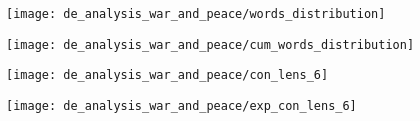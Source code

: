 \begin{minipage}[hbt]{9cm}
	\centering
	\texttt{[image: de\_analysis\_war\_and\_peace/words\_distribution]}
	\label{Bild1}
\end{minipage}
\hfill
\begin{minipage}[hbt]{9cm}
	\centering
	\texttt{[image: de\_analysis\_war\_and\_peace/cum\_words\_distribution]}
	\label{Bild2}
\end{minipage}
\begin{minipage}[hbt]{9cm}
	\centering
	\texttt{[image: de\_analysis\_war\_and\_peace/con\_lens\_6]}
	\label{Bild1}
\end{minipage}
\hfill
\begin{minipage}[hbt]{9cm}
	\centering
	\texttt{[image: de\_analysis\_war\_and\_peace/exp\_con\_lens\_6]}
	\label{Bild2}
\end{minipage}

